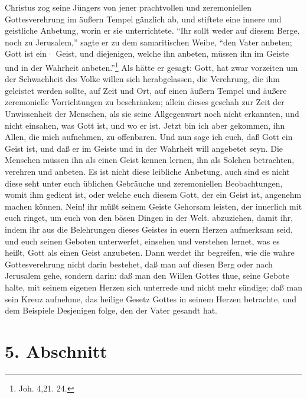 Christus zog seine Jüngers von jener prachtvollen und zeremoniellen
Gottesverehrung im äußern Tempel gänzlich ab, und stiftete eine innere und
geistliche Anbetung, worin  er sie unterrichtete. "`Ihr sollt weder auf diesem
Berge, noch zu Jerusalem,"' sagte er zu dem samaritischen Weibe, "`den Vater
anbeten; Gott ist ein· Geist, und diejenigen, welche ihn anbeten, müssen ihn im
Geiste und in der Wahrheit anbeten."'\footnote{Joh. 4,21. 24.}  Als hätte er
gesagt: Gott, hat zwar vorzeiten um der Schwachheit des Volke willen sich
herabgelassen, die Verehrung, die ihm geleistet werden sollte, auf Zeit und Ort,
auf einen äußern Tempel und äußere zeremonielle Vorrichtungen zu beschränken;
allein dieses geschah zur Zeit der Unwissenheit der Menschen, als sie seine
Allgegenwart noch nicht erkannten, und nicht einsahen, was Gott ist, und wo er
ist. Jetzt bin ich aber gekommen, ihn Allen, die mich aufnehmen, zu offenbaren.
Und nun sage ich euch, daß Gott ein Geist ist, und daß er im Geiste und in der
Wahrheit will angebetet seyn. Die Menschen müssen ihn als einen Geist kennen
lernen, ihn als Solchen betrachten, verehren und anbeten. Es ist nicht diese
leibliche Anbetung, auch sind es nicht diese seht unter euch üblichen Gebräuche
und zeremoniellen Beobachtungen, womit ihm gedient ist, oder welche euch diesem
Gott, der ein Geist ist, angenehm machen können. Nein! ihr müßt seinem Geiste
Gehorsam leisten, der innerlich mit euch ringet, um euch von den bösen Dingen in
der Welt. abzuziehen, damit ihr, indem ihr aus die Belehrungen dieses Geistes in
euern Herzen aufmerksam seid, und euch seinen Geboten unterwerfet, einsehen und
verstehen lernet, was es heißt, Gott als einen Geist anzubeten. Dann werdet ihr
begreifen, wie die wahre Gottesverehrung nicht darin bestehet, daß man auf
diesen Berg oder nach Jerusalem gehe, sondern darin: daß man den Willen Gottes
thue, seine Gebote halte, mit seinem eigenen Herzen sich unterrede und nicht
mehr sündige; daß man sein Kreuz aufnehme, das heilige Gesetz Gottes in seinem
Herzen betrachte, und dem Beispiele Desjenigen folge, den der Vater gesandt hat.

\section{5. Abschnitt} \label{kap5_ab5}

